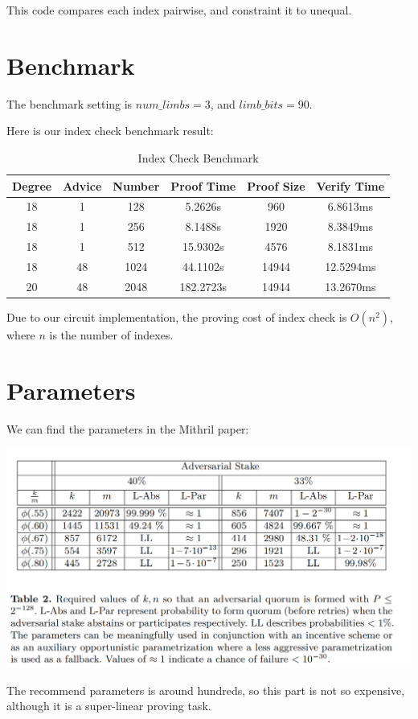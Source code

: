 \documentclass{article}
\begin{document}
This code compares each index pairwise, and constraint it to unequal.


\section{Benchmark}

The benchmark setting is $num\_limbs = 3$, and $limb\_bits = 90$.

Here is our index check benchmark result:


\begin{table}[htbp]
  \centering
    \begin{tabular}{|c|c|c|c|c|c|}
    \hline
    {Degree} & {Advice} & {Number} & {Proof Time} & {Proof Size} & {Verify Time} \\
    \hline
    18 & 1 & 128 & 5.2626s & 960 & 6.8613ms \\ \hline
    18 & 1 & 256 & 8.1488s & 1920 & 8.3849ms \\ \hline
    18 & 1 & 512 & 15.9302s & 4576 & 8.1831ms \\ \hline
    18 & 48 & 1024 & 44.1102s & 14944 & 12.5294ms \\ \hline
    20 & 48 & 2048 & 182.2723s & 14944 & 13.2670ms \\
    \hline
  \end{tabular}
  \caption{Index Check Benchmark}
\end{table}

Due to our circuit implementation, the proving cost of index check is $O(n^2)$, where $n$ is the number of indexes.


\section{Parameters}

We can find the parameters in the Mithril paper:

\includegraphics[width=1\linewidth]{mithril_km_parameter.png}

The recommend parameters is around hundreds, so this part is not so expensive, although it is a super-linear proving task.
\end{document}
